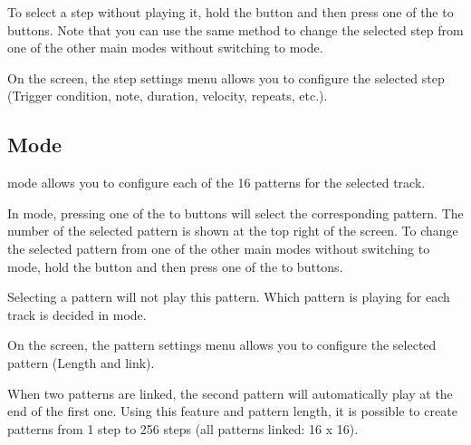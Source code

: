 \documentclass[8pt]{extarticle}
\newcommand{\OLEDscreenshot}[1]{
\begin{tcolorbox}[hbox, colframe=black, colback=white, boxsep=-3pt]%
\texttt{[image: \#1]}
\end{tcolorbox}
}
\begin{document}
\begin{multicols*}{3}
\begin{center}
    \scalebox{0.7}{
    \begin{tikzpicture}
        [spy using outlines={circle, magnification=3, connect spies},
        image/.style = {scale=0.6,},
        ]

        \node[image] (A) {\OLEDscreenshot{../assets/OLED-screenshots/PGB1-OLED-track-LFO.png}};

        \spy [black, size=2.4cm] on (0.7,0.6) in node [left] at (4.0,0.0);
    \end{tikzpicture}
    }
\end{center}


To select a step without playing it, hold the  button and then press one of the  to  buttons. Note that you can use the same method to change the selected step from one of the other main modes without switching to  mode.

On the screen, the step settings menu allows you to configure the selected step (Trigger condition, note, duration, velocity, repeats, etc.).

\subsection{ Mode}

 mode allows you to configure each of the 16 patterns for the selected track.

In  mode, pressing one of the  to  buttons will select the corresponding pattern. The number of the selected pattern is shown at the top right of the screen.
To change the selected pattern from one of the other main modes without switching to  mode, hold the  button and then press one of the  to  buttons.

\begin{important}
    Selecting a pattern will not play this pattern.
    Which pattern is playing for each track is decided in  mode.
\end{important}

On the screen, the pattern settings menu allows you to configure the selected pattern (Length and link).

When two patterns are linked, the second pattern will automatically play at the end of the first one. Using this feature and pattern length, it is possible to create patterns from 1 step to 256 steps (all patterns linked: 16 x 16).


\end{multicols*}
\end{document}
